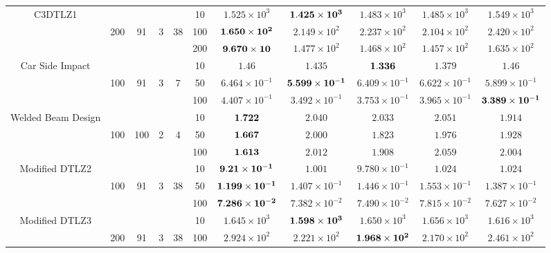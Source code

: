 \documentclass[../main/main]{subfiles}
\begin{document}
\begin{table}[htbp]
\begin{tabular}{c|ccccc|c|c|c|c|c}
\hline
\multirow{3}{*}{C3DTLZ1} &        &   &&    & 10 &$1.525 \times 10^{3}$ & $\bf{1.425 \times 10^{3}}$ & $1.483 \times 10^{3}$ & $1.485 \times 10^{3}$ & $1.549 \times 10^{3}$\\
                                          &200 & 91 &3 & 38 & 100 &$\bf{1.650 \times 10^{2}}$ & $2.149 \times 10^{2}$ & $2.237 \times 10^{2}$ & $2.104 \times 10^{2}$ & $2.420 \times 10^{2}$\\
				   &        &    &&    &200 &$\bf{9.670 \times 10}$ & $1.477 \times 10^{2}$ & $1.468 \times 10^{2}$ & $1.457 \times 10^{2}$ & $1.635 \times 10^{2}$\\
\hline
\multirow{3}{*}{\scriptsize Car Side Impact} &  &&      &       & 10 &$1.46$ & $1.435$ & $\bf{1.336}$ & $1.379$ & $1.46$\\
  				   &100 & 91 & 3 & 7 & 50 &$6.464 \times 10^{-1}$ & $\bf{5.599 \times 10^{-1}}$ & $6.409 \times 10^{-1}$ & $6.622 \times 10^{-1}$ & $5.899 \times 10^{-1}$\\
				   &        &   &&     &100 &$4.407 \times 10^{-1}$ & $3.492 \times 10^{-1}$ & $3.753 \times 10^{-1}$ & $3.965 \times 10^{-1}$ & $\bf{3.389 \times 10^{-1}}$\\
\hline
\multirow{3}{*}{\fontsize{6pt}{0pt}\selectfont Welded Beam Design} &   &&     &       & 10 &$\bf{1.722}$ & $2.040$ & $2.033$ & $2.051$ & $1.914$\\
  				   &100 & 100 & 2 & 4 & 50 &$\bf{1.667}$ & $2.000$ & $1.823$ & $1.976$ & $1.928$\\
				   &        &     &&   &100 &$\bf{1.613}$ & $2.012$ & $1.908$ & $2.059$ & $2.004$\\
\hline
\multirow{3}{*}{\fontsize{6.5pt}{0pt}\selectfont Modified DTLZ2} & &&       &       & 10 &$\bf{9.21 \times 10^{-1}}$ & $1.001$ & $9.780 \times 10^{-1}$ & $1.024$ & $1.024$\\
  				   & 100 & 91 & 3 & 38 &50 &$\bf{1.199 \times 10^{-1}}$ & $1.407 \times 10^{-1}$ & $1.446 \times 10^{-1}$ & $1.553 \times 10^{-1}$ & $1.387 \times 10^{-1}$\\
				   &        &      &&  &100 &$\bf{7.286 \times 10^{-2}}$ & $7.382 \times 10^{-2}$ & $7.490 \times 10^{-2}$ & $7.815 \times 10^{-2}$ & $7.627 \times 10^{-2}$\\
\hline
\multirow{3}{*}{\fontsize{6.5pt}{0pt}\selectfont Modified DTLZ3} & &&       &       & 10 &$1.645 \times 10^{3}$ & $\bf{1.598 \times 10^{3}}$ & $1.650 \times 10^{3}$ & $1.656 \times 10^{3}$ & $1.616 \times 10^{3}$\\
  				   & 200 & 91 & 3 & 38 &100 &$2.924 \times 10^{2}$ & $2.221 \times 10^{2}$ & $\bf{1.968 \times 10^{2}}$ & $2.170 \times 10^{2}$ & $2.461 \times 10^{2}$\\

\end{tabular}
\end{table}
\end{document}
